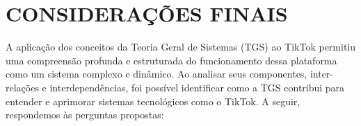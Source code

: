 \section{CONSIDERAÇÕES FINAIS}

A aplicação dos conceitos da Teoria Geral de Sistemas (TGS) ao TikTok permitiu uma compreensão profunda e estruturada do funcionamento dessa plataforma como um sistema complexo e dinâmico. Ao analisar seus componentes, inter-relações e interdependências, foi possível identificar como a TGS contribui para entender e aprimorar sistemas tecnológicos como o TikTok. A seguir, respondemos às perguntas propostas:


